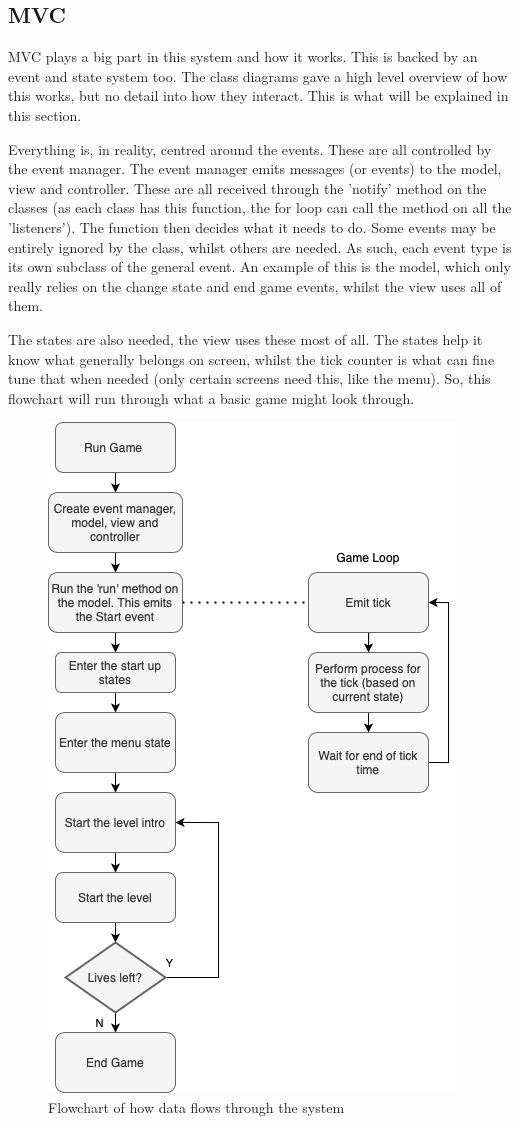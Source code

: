 \subsection{MVC}
MVC plays a big part in this system and how it works. This is backed by an event and state system too. The class diagrams gave a high level overview of how this works, but no detail into how they interact. This is what will be explained in this section.

Everything is, in reality, centred around the events. These are all controlled by the event manager. The event manager emits messages (or events) to the model, view and controller. These are all received through the 'notify' method on the classes (as each class has this function, the for loop can call the method on all the 'listeners'). The function then decides what it needs to do. Some events may be entirely ignored by the class, whilst others are needed. As such, each event type is its own subclass of the general event. An example of this is the model, which only really relies on the change state and end game events, whilst the view uses all of them.

The states are also needed, the view uses these most of all. The states help it know what generally belongs on screen, whilst the tick counter is what can fine tune that when needed (only certain screens need this, like the menu). So, this flowchart will run through what a basic game might look through.
\begin{figure}[H]
  \includegraphics[width=0.7\linewidth]{Figures/flowchart.png}
  \centering
  \caption{Flowchart of how data flows through the system}
  \label{fig:flowchart}
\end{figure}

